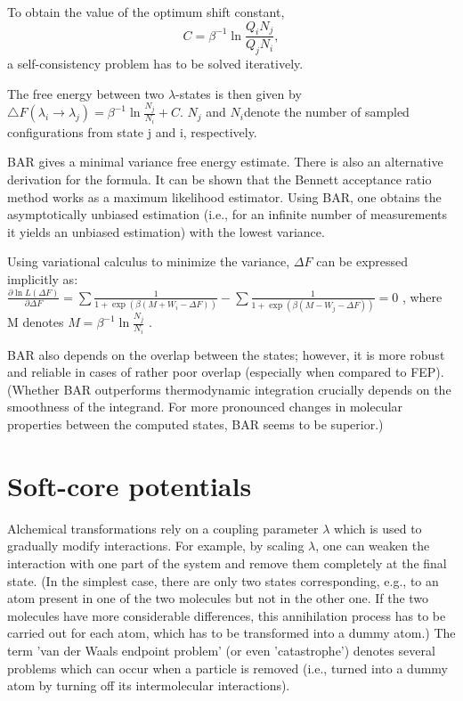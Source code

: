 To obtain the value of the optimum shift constant,
\[
C=\beta^{-1}\ln\frac{Q_{i}N_{j}}{Q_{j}N_{i}},
\]
a self-consistency
problem has to be solved iteratively\cite{Gapsys.2015}.

The free energy between two $\lambda$-states is then given by $\bigtriangleup F\left(\lambda_{i}\rightarrow\lambda_{j}\right)=\beta^{-1}\ln\frac{N_{j}}{N_{i}}+C$\cite{Bruckner.2011}.
$N_{j}$ and $N_{i}$denote the number of sampled configurations from
state j and i, respectively.

BAR gives a minimal variance free energy estimate. There is also an
alternative derivation for the formula. It can be shown that the
Bennett acceptance ratio method works as a maximum likelihood estimator.
Using BAR, one obtains the asymptotically unbiased estimation (i.e., for an infinite
number of measurements it yields an unbiased estimation) 
with the lowest variance\cite{Shirts.2003}. 

Using variational calculus to minimize the variance, $\Delta F$ can
be expressed implicitly as:$\frac{\partial\ln L\left(\Delta F\right)}{\partial\Delta F}=\sum\frac{1}{1+\exp\left(\beta\left(M+W_{i}-\Delta F\right)\right)}-\sum\frac{1}{1+\exp\left(\beta\left(M-W_{j}-\Delta F\right)\right)}=0$
, where M denotes $M=\beta^{-1}\ln\frac{N_{j}}{N_{i}}$ \cite{Shirts.2003}.

BAR also depends on the overlap between the states; however, it is
more robust and reliable in cases of rather poor overlap \cite{Ruiter.2013}
(especially when compared to FEP). (Whether BAR outperforms thermodynamic
integration crucially depends on the smoothness of the integrand.
For more pronounced changes in molecular properties between the computed
states, BAR seems to be superior\cite{Shirts.2013}.)

\section{Soft-core potentials}

Alchemical transformations rely on a coupling parameter $\lambda$ which
is used to gradually modify interactions. For example, by scaling $\lambda$, one can weaken the interaction with one part of the system and remove them completely at the final state. (In the simplest case,
there are only two states corresponding, e.g., to an atom present in
one of the two molecules but not in the other one. If the two molecules
have more considerable differences, this annihilation process has to be carried out for each atom, which has to be transformed
into a dummy atom.)
The term 'van der Waals endpoint problem' (or even 'catastrophe') denotes
several problems which can occur when a particle is removed (i.e.,
turned into a dummy atom by turning off its intermolecular interactions).
\cite{Boresch.2011}

